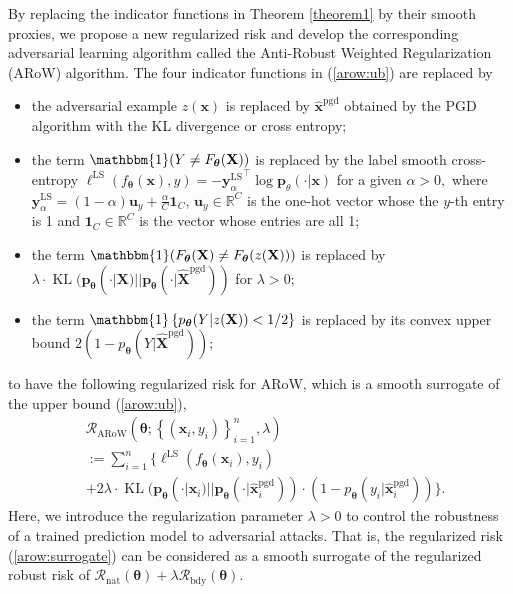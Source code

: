 \documentclass[nohyperref]{article}
\theoremstyle{plain}
\theoremstyle{definition}
\theoremstyle{remark}
\begin{document}
By replacing the indicator functions in Theorem
\ref{theorem1} by their smooth proxies,
we propose a new regularized risk and develop
the corresponding adversarial learning algorithm called the Anti-Robust Weighted Regularization (ARoW) algorithm. The four indicator functions in (\ref{arow:ub}) are
replaced by
\begin{itemize}
\item the adversarial example $z(\bm{x})$
is replaced by $\widehat{\bm{x}}^{\text{pgd}}$
obtained by the PGD algorithm with the KL divergence or cross entropy;
\item the term $\mathbbm{1}(Y \neq F_{\bm{\theta}}(\mathbf{X}))$
is replaced by the label smooth cross-entropy \citep{muller2019when}
 $\ell^{\text{LS}}(f_{\bm{\theta}}(\bm{x}), y) = - {\bm{y}_{\alpha}^{\text{LS}}}^{\top} \log \mathbf{p}_{\theta}(\cdot|\bm{x})$ 
 for a given $\alpha>0,$ where $\bm{y}_{\alpha}^{\text{LS}} = (1-\alpha)\mathbf{u}_y + \frac{\alpha}{C}\mathbf{1}_C$, $\mathbf{u}_y \in \mathbb{R}^{C}$ is the one-hot vector whose the $y$-th entry is 1 and $\mathbf{1}_C \in \mathbb{R}^{C}$ is the vector whose entries are all 1;
\item the term $\mathbbm{1}( F_{\bm{\theta}}(\mathbf{X})
\neq F_{\bm{\theta}}(z(\mathbf{X})))$
is replaced by
$ \lambda \cdot \operatorname{KL}(\mathbf{p}_{\bm{\theta}}(\cdot|\mathbf{X}) || \mathbf{p}_{\bm{\theta}}(\cdot|\widehat{\mathbf{X}}^{\text{pgd}}))$
for $\lambda>0;$

\item the term 
$\mathbbm{1} \left\{ p_{\bm{\theta}}(Y | z(\mathbf{X})) < 1/2 \right\}$ is replaced
by its convex upper bound $2 (1- p_{\bm{\theta}}(Y | \widehat{\mathbf{X}}^{\text{pgd}} ));$
 \end{itemize}
 to have the following regularized risk for ARoW, which is a smooth surrogate of the upper bound (\ref{arow:ub}),
 \begin{align}
    &\mathcal{R}_{\text{ARoW}}(\bm{\theta} ; \left\{(\bm{x}_i, y_i) \right\}_{i=1}^n, \lambda) \nonumber \\
    &:= \sum\limits_{i=1}^n \bigg\{ \ell^{\text{LS}}(f_{\bm{\theta}}(\bm{x}_i), y_i) 
    \nonumber \\ 
    & + 2 \lambda \cdot \operatorname{KL}(\mathbf{p}_{\bm{\theta}}(\cdot|\bm{x}_i) || \mathbf{p}_{\bm{\theta}}(\cdot|\widehat{\bm{x}}^{\text{pgd}}_i)) \cdot (1 - p_{\bm{\theta}}(y_i|\widehat{\bm{x}}^{\text{pgd}}_i)) \bigg\}
    \label{arow:surrogate}.
\end{align}
Here, we introduce the regularization parameter $\lambda>0$ to control the robustness of a trained prediction model to adversarial attacks. That is, the regularized risk (\ref{arow:surrogate}) can be considered as a smooth surrogate
of the regularized robust risk
of $\mathcal{R}_{\text{nat}}(\bm{\theta})
+ \lambda \mathcal{R}_{\text{bdy}}(\bm{\theta}).$
\end{document}
